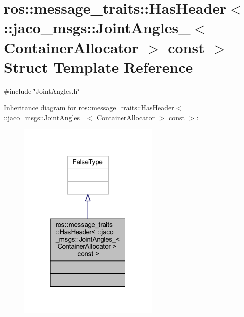 \hypertarget{structros_1_1message__traits_1_1HasHeader_3_01_1_1jaco__msgs_1_1JointAngles___3_01ContainerAllocator_01_4_01const_01_01_4}{}\section{ros\+:\+:message\+\_\+traits\+:\+:Has\+Header$<$ \+:\+:jaco\+\_\+msgs\+:\+:Joint\+Angles\+\_\+$<$ Container\+Allocator $>$ const $>$ Struct Template Reference}
\label{structros_1_1message__traits_1_1HasHeader_3_01_1_1jaco__msgs_1_1JointAngles___3_01ContainerAllocator_01_4_01const_01_01_4}


{\ttfamily \#include \char`\"{}Joint\+Angles.\+h\char`\"{}}



Inheritance diagram for ros\+:\+:message\+\_\+traits\+:\+:Has\+Header$<$ \+:\+:jaco\+\_\+msgs\+:\+:Joint\+Angles\+\_\+$<$ Container\+Allocator $>$ const $>$\+:
\nopagebreak
\begin{figure}[H]
\begin{center}
\leavevmode
\includegraphics[width=193pt]{d5/d41/structros_1_1message__traits_1_1HasHeader_3_01_1_1jaco__msgs_1_1JointAngles___3_01ContainerAllocaf0499f3709557bc014979a64be319d6}
\end{center}
\end{figure}


